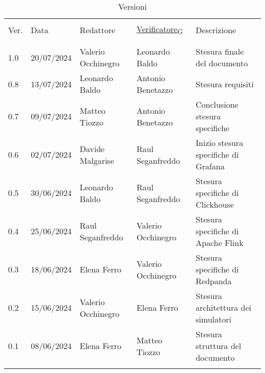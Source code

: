 \documentclass[italian,12pt]{article} %
\begin{document}


\newpage



\captionsetup[table]{list=no}
\begin{table}[!h]
	\footnotesize
	\begin{center}
		\caption*{Versioni}
		\vspace{0.5cm}
		\begin{tabular}{ l l l l p{6.1cm} }
			\hline                                                                                                          \\[-2ex]
			Ver. & Data & Redattore & \href{https://7last.github.io/docs/pb/documentazione-interna/glossario\#verificatore}{Verificatore\textsubscript{G}} & Descrizione\\
			\\[-2ex] \hline \\[-1.5ex]
      1.0  & 20/07/2024 & Valerio Occhinegro & Leonardo Baldo     & Stesura finale del documento \\
      0.8  & 13/07/2024 & Leonardo Baldo     & Antonio Benetazzo  & Stesura requisiti \\
      0.7  & 09/07/2024 & Matteo Tiozzo      & Antonio Benetazzo  & Conclusione stesura specifiche \\
      0.6  & 02/07/2024 & Davide Malgarise   & Raul Seganfreddo   & Inizio stesura specifiche di Grafana \\
      0.5  & 30/06/2024 & Leonardo Baldo     & Raul Seganfreddo   & Stesura specifiche di Clickhouse \\
      0.4  & 25/06/2024 & Raul Seganfreddo   & Valerio Occhinegro & Stesura specifiche di Apache Flink\\
      0.3  & 18/06/2024 & Elena Ferro        & Valerio Occhinegro & Stesura specifiche di Redpanda\\
      0.2  & 15/06/2024 & Valerio Occhinegro & Elena Ferro        & Stesura architettura dei simulatori  \\
      0.1  & 08/06/2024 & Elena Ferro        & Matteo Tiozzo      & Stesura struttura del documento \\
			\\[-1.5ex] \hline
		\end{tabular}
	\end{center}
\end{table}
\captionsetup[table]{list=yes}

\newpage
\tableofcontents
\newpage
\listoftables
\listoffigures
\lstlistoflistings
\newpage

\newpage

\newpage

\newpage
% 

\end{document}
